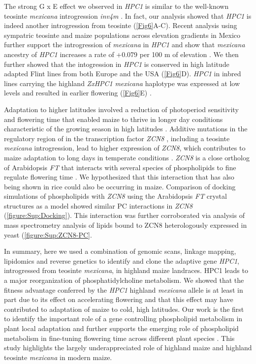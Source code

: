 \documentclass[9pt,twocolumn,twoside,lineno]{biorxiv}
\newcommand{\mex}{\textit{mexicana}\xspace}
\newcommand{\hpc}{\textit{HPC1}\xspace}
\begin{document}
The strong G x E effect we observed in \hpc is similar to the well-known teosinte \mex introgression \textit{inv4m} \cite{Crow2020-gene}. 
In fact, our analysis showed that \hpc is indeed another introgression from teosinte  (\cref{Fig6}A-C). 
Recent analysis using sympatric teosinte and maize populations across elevation gradients in Mexico further support the introgression of \mex in \hpc and show that \mex ancestry of \hpc increases a rate of +0.079 per 100 m of elevation \cite{Calfee2021-mr}.
We then further showed that the  intogression in \hpc is conserved in high latitude adapted Flint lines from both Europe and the USA (\cref{Fig6}D).
\textit{HPC1} in inbred lines carrying the highland \textit{ZxHPC1} \mex haplotype was expressed at low levels and resulted in earlier flowering (\cref{Fig6}E) \cite{Kremling2018-gn}.  

Adaptation to higher latitudes involved a reduction of photoperiod sensitivity and flowering time that enabled maize to thrive in longer day conditions characteristic of the growing season in high latitudes \cite{Hung2012-ms, Swarts2017-ge, Yang2013-lg, Huang2018-ga}.
Additive mutations in the regulatory region of in the transcription factor \textit{ZCN8} \cite{Lazakis2011-nq}, including a teosinte \mex introgression, lead to higher expression of \textit{ZCN8}, which contributes to maize adaptation to long days in temperate conditions \cite{Guo2019-pn}.
\textit{ZCN8} is a close ortholog of Arabidopsis \textit{FT} that interacts with several species of phospholipids to fine regulate flowering time \cite{Nakamura2014-qf, Susila2021-dz}.  
We hypothesized that this interaction that has also being shown in rice \cite{Qu2021-wc} could also be occurring in maize. 
Comparison of docking simulations of phospholipids with \textit{ZCN8} using the Arabidopsis \textit{FT} crystal structures as a model \cite{Nakamura2019-ht} showed similar PC interactions in \textit{ZCN8} (\cref{figure:Sup:Docking}).
This interaction was further corroborated via analysis of mass spectrometry analysis of lipids bound to ZCN8 heterologously expressed in yeast (\cref{figure:Sup:ZCN8-PC}. 

In summary, here we used a combination of genomic scans, linkage mapping, lipidomics and reverse genetics to identify and clone the adaptive gene \hpc, introgressed from teosinte  \mex, in highland maize landraces. HPC1 leads to a major reorganization of phosphatidylcholine metabolism. 
We showed that the fitness advantage conferred by the \hpc highland \mex allele is at least in part due to its effect on accelerating flowering and that this effect may have contributed to adaptation of maize to cold, high latitudes. 
Our work is the first to identify the important role of a gene controlling phospholipid metabolism in plant local adaptation and further supports the emerging role of phospholipid metabolism in fine-tuning flowering time across different plant species \cite{Nakamura2014-qf, Susila2021-dz, Guo2019-pn}.
This study highlights the largely underappreciated role of highland maize and highland teosinte \mex in modern maize.
\end{document}
